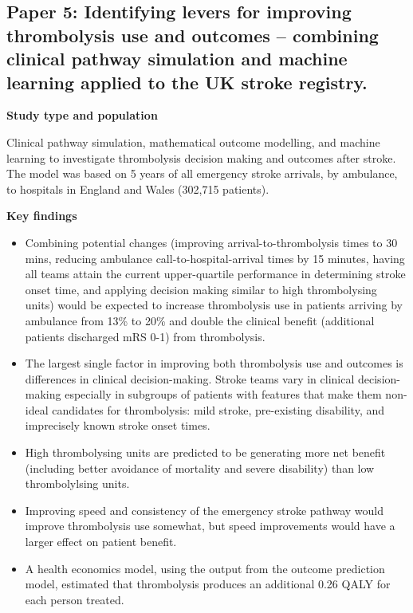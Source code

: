 \subsection{Paper 5: Identifying levers for improving thrombolysis use and outcomes – combining clinical pathway simulation and machine learning applied to the UK stroke registry.\cite{pearn_identifying_2024}}

\textbf{Study type and population}

Clinical pathway simulation, mathematical outcome modelling, and machine learning to investigate thrombolysis decision making and outcomes after stroke. The model was based on 5 years of all emergency stroke arrivals, by ambulance, to hospitals in England and Wales (302,715 patients).

\textbf{Key findings}

\begin{itemize}
    \item Combining potential changes (improving arrival-to-thrombolysis times to 30 mins, reducing ambulance call-to-hospital-arrival times by 15 minutes, having all teams attain the current upper-quartile performance in determining stroke onset time, and applying decision making similar to high thrombolysing units) would be expected to increase thrombolysis use in patients arriving by ambulance from 13\% to 20\% and double the clinical benefit (additional patients discharged mRS 0-1) from thrombolysis.
    
    \item The largest single factor in improving both thrombolysis use and outcomes is differences in clinical decision-making. Stroke teams vary in clinical decision-making especially in subgroups of patients with features that make them non-ideal candidates for thrombolysis: mild stroke, pre-existing disability, and imprecisely known stroke onset times.
    
    \item High thrombolysing units are predicted to be generating more net benefit (including better avoidance of mortality and severe disability) than low thrombolylsing units.

    \item Improving speed and consistency of the emergency stroke pathway would improve thrombolysis use somewhat, but speed improvements would have a larger effect on patient benefit.
    
    \item A health economics model, using the output from the outcome prediction model, estimated that thrombolysis produces an additional 0.26 QALY for each person treated.

\end{itemize}

